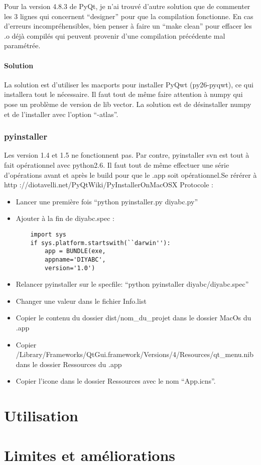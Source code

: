 \documentclass[12pt,a4paper]{article}
\begin{document}
        Pour la version 4.8.3 de PyQt, je n'ai trouvé d'autre solution que de commenter les 3 lignes qui concernent
        ``designer'' pour que la compilation fonctionne. En cas d'erreurs incompréhensibles, bien penser à faire un ``make clean''
        pour effacer les .o déjà compilés qui peuvent provenir d'une compilation précédente mal paramétrée.

        \paragraph{Solution}

        La solution est d'utiliser les macports pour installer PyQwt (py26-pyqwt), ce qui installera tout le n\'ecessaire. Il faut tout de même
        faire attention à numpy qui pose un problème de version de lib vector. La solution est de d\'esinstaller numpy et de l'installer avec l'option
        ``-atlas''. 
        
        \subsubsection{pyinstaller}

        Les version 1.4 et 1.5 ne fonctionnent pas. Par contre,
        pyinstaller svn est tout à fait op\'erationnel avec python2.6. Il faut tout de même effectuer une s\'erie d'op\'erations avant et après
        le build pour que le .app soit op\'erationnel.Se r\'er\'erer à \newline
        http ://diotavelli.net/PyQtWiki/PyInstallerOnMacOSX \newline
        Protocole : 
        \begin{itemize}
            \item Lancer une première fois ``python pyinstaller.py diyabc.py''
            \item Ajouter à la fin de diyabc.spec :
        \begin{verbatim}
    import sys 
    if sys.platform.startswith(``darwin''): 
        app = BUNDLE(exe, 
        appname='DIYABC', 
        version='1.0')
        \end{verbatim}
            \item Relancer pyinstaller sur le specfile: ``python pyinstaller diyabc/diyabc.spec''
            \item Changer une valeur dans le fichier Info.list
            \item Copier le contenu du dossier dist/nom\_du\_projet dans le dossier MacOs du .app
            \item Copier /Library/Frameworks/QtGui.framework/Versions/4/Resources/qt\_menu.nib dans le dossier Ressources du .app
            \item Copier l'icone dans le dossier Ressources avec le nom ``App.icns''.
        \end{itemize}

\section{Utilisation}

\section{Limites et améliorations}
\end{document}
